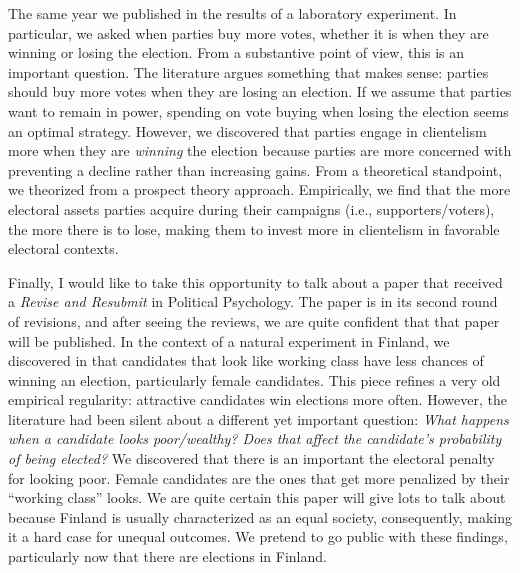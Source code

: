 \documentclass[10pt,stdletter,dateno,sigleft]{newlfm} %
\begin{document}
\begin{newlfm}
The same year we published in \href{https://doi.org/10.1016/j.electstud.2022.102497}{\textcite{Bahamonde2022b}} the results of a laboratory experiment. In particular, we asked when parties buy more votes, whether it is when they are winning or losing the election. From a substantive point of view, this is an important question. The literature argues something that makes sense: parties should buy more votes when they are losing an election. If we assume that parties want to remain in power, spending on vote buying when losing the election seems an optimal strategy. However, we discovered that parties engage in clientelism more when they are \emph{winning} the election because parties are more concerned with preventing a decline rather than increasing gains. From a theoretical standpoint, we theorized from a prospect theory approach. Empirically, we find that the more electoral assets parties acquire during their campaigns (i.e., supporters/voters), the more there is to lose, making them to invest more in clientelism in favorable electoral contexts. 

Finally, I would like to take this opportunity to talk about a paper that received a \emph{Revise and Resubmit} in Political Psychology. The paper is in its second round of revisions, and after seeing the reviews, we are quite confident that that paper will be published. In the context of a natural experiment in Finland, we discovered in \textcite{Bahamonde:2023} that candidates that look like working class have less chances of winning an election, particularly female candidates. This piece refines a very old empirical regularity: attractive candidates win elections more often. However, the literature had been silent about a different yet important question: \emph{What happens when a candidate looks poor/wealthy? Does that affect the candidate's probability of being elected?} We discovered that there is an important the electoral penalty for looking poor. Female candidates are the ones that get more penalized by their ``working class'' looks. We are quite certain this paper will give lots to talk about because Finland is usually characterized as an equal society, consequently, making it a hard case for unequal outcomes. We pretend to go public with these findings, particularly now that there are elections in Finland.


\end{newlfm}
\end{document}

